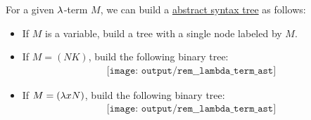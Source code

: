 \begin{remark}\label{rem:lambda_term_ast}
  For a given \( \mathrm{\lambda} \)-term \( M \), we can build a \hyperref[rem:abstract_syntax_tree]{abstract syntax tree} as follows:
  \begin{itemize}
    \item If \( M \) is a variable, build a tree with a single node labeled by \( M \).
    \item If \( M = (NK) \), build the following binary tree:
    \begin{equation*}
      \begin{aligned}
        \texttt{[image: output/rem\_\_lambda\_term\_ast]}
      \end{aligned}
    \end{equation*}

    \item If \( M = (\mathrm{\lambda} x N) \), build the following binary tree:
    \begin{equation*}
      \begin{aligned}
        \texttt{[image: output/rem\_\_lambda\_term\_ast]}
      \end{aligned}
    \end{equation*}
  \end{itemize}
\end{remark}

